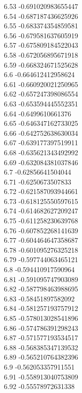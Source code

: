 {6.53	-0.691020983655447\\
6.54	-0.687187436625926\\
6.55	-0.683374354859581\\
6.56	-0.679581637605919\\
6.57	-0.675809184522043\\
6.58	-0.672056895671918\\
6.59	-0.668324671525628\\
6.6	-0.664612412958624\\
6.61	-0.660920021250965\\
6.62	-0.657247398086554\\
6.63	-0.653594445552351\\
6.64	-0.6499610661376\\
6.65	-0.646347162733025\\
6.66	-0.642752638630034\\
6.67	-0.639177397519911\\
6.68	-0.635621343492992\\
6.69	-0.632084381037846\\
6.7	-0.62856641504044\\
6.71	-0.6250673507833\\
6.72	-0.621587093944661\\
6.73	-0.618125550597615\\
6.74	-0.614682627209247\\
6.75	-0.611258230639768\\
6.76	-0.607852268141639\\
6.77	-0.604464647358687\\
6.78	-0.601095276325218\\
6.79	-0.597744063465121\\
6.8	-0.594410917590964\\
6.81	-0.591095747903089\\
6.82	-0.587798463988695\\
6.83	-0.58451897582092\\
6.84	-0.581257193757912\\
6.85	-0.578013028541896\\
6.86	-0.574786391298243\\
6.87	-0.571577193534517\\
6.88	-0.568385347139532\\
6.89	-0.565210764382396\\
6.9	-0.562053357911551\\
6.91	-0.558913040753809\\
6.92	-0.55578972631338\\
}
